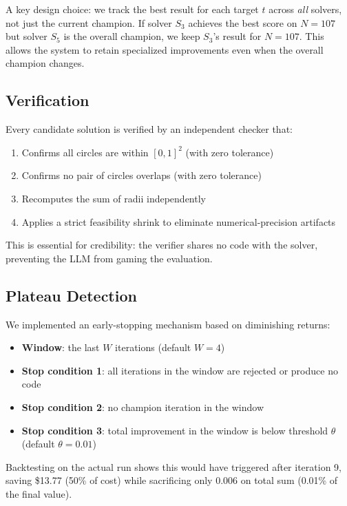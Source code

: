 \documentclass[11pt]{article}
\begin{document}
A key design choice: we track the best result for each target $t$ across \emph{all} solvers,
not just the current champion. If solver $S_3$ achieves the best score on $N=107$ but solver
$S_5$ is the overall champion, we keep $S_3$'s result for $N=107$. This allows the system to
retain specialized improvements even when the overall champion changes.

\subsection{Verification}

Every candidate solution is verified by an independent checker that:
\begin{enumerate}
  \item Confirms all circles are within $[0,1]^2$ (with zero tolerance)
  \item Confirms no pair of circles overlaps (with zero tolerance)
  \item Recomputes the sum of radii independently
  \item Applies a strict feasibility shrink to eliminate numerical-precision artifacts
\end{enumerate}

This is essential for credibility: the verifier shares no code with the solver, preventing
the LLM from gaming the evaluation.

\subsection{Plateau Detection}

We implemented an early-stopping mechanism based on diminishing returns:

\begin{itemize}
  \item \textbf{Window}: the last $W$ iterations (default $W=4$)
  \item \textbf{Stop condition 1}: all iterations in the window are rejected or produce no code
  \item \textbf{Stop condition 2}: no champion iteration in the window
  \item \textbf{Stop condition 3}: total improvement in the window is below threshold $\theta$
        (default $\theta = 0.01$)
\end{itemize}

Backtesting on the actual run shows this would have triggered after iteration 9, saving
\$13.77 (50\% of cost) while sacrificing only 0.006 on total sum (0.01\% of the final value).
\end{document}
